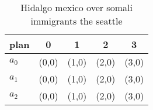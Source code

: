 \documentclass[a4paper]{article}
\begin{document}
\begin{table}
\begin{adjustbox}{width=0.5\columnwidth}
\begin{tabular}{|l|l|l|l|l|}
\hline
\textbf{plan} & \multicolumn{1}{c|}{\textbf{0}} & \multicolumn{1}{c|}{\textbf{1}} & \multicolumn{1}{c|}{\textbf{2}} & \multicolumn{1}{c|}{\textbf{3}} \\ \hline
\textbf{$a_0$}  & (0,0) & (1,0) & (2,0) & (3,0) \\ \hline
\textbf{$a_1$}  & (0,0) & (1,0) & (2,0) & (3,0) \\ \hline
\textbf{$a_2$}  & (0,0) & (1,0) & (2,0) & (3,0) \\ \hline
\end{tabular}
\end{adjustbox}
\caption{Hidalgo mexico over somali immigrants the seattle
}
\end{table}
\end{document}
